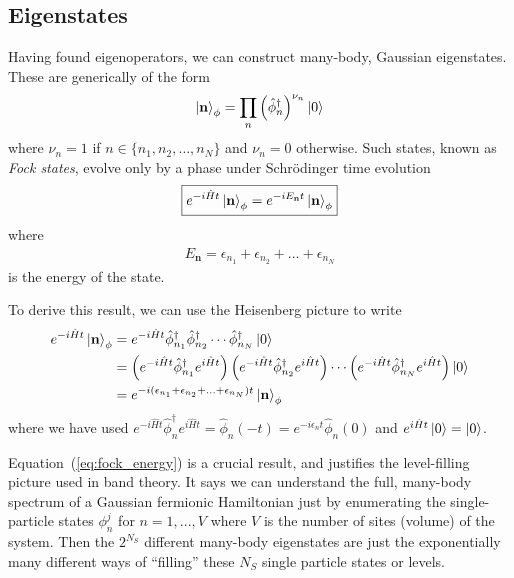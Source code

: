 \documentclass[aps, superscriptaddress, floatfix, onecolumn]{revtex4-2}
\begin{document}
\subsection{Eigenstates}

Having found eigenoperators, we can construct many-body, Gaussian eigenstates. These are generically of the form
\begin{align}
\ket{\mathbf{n}}_\phi = \prod_{n} \left(\hat{\phi}^\dagger_n \right)^{\nu_n} \ket{0}  
\end{align}
where $\nu_n = 1$ if $n \in \{n_1, n_2, \ldots, n_N \}$ and $\nu_n = 0$ otherwise. Such states, known as \emph{Fock states}, 
evolve only by a phase under Schr\"odinger time evolution
\begin{align}
\boxed{e^{-i \hat{H} t} \ket{\mathbf{n}}_\phi  = e^{-i E_\mathbf{n} t}  \ket{\mathbf{n}}_\phi }
\end{align}
where 
\begin{align}
\boxed{E_\mathbf{n}  = \epsilon_{n_1} + \epsilon_{n_2} + \ldots + \epsilon_{n_N}} \label{eq:fock_energy}
\end{align}
 is the energy of the state.
 
To derive this result, we can use the Heisenberg picture to write
\begin{align}
e^{-i \hat{H} t} \ket{\mathbf{n}}_\phi  & = e^{-i \hat{H} t} \hat{\phi}^\dagger_{n_1} \hat{\phi}^\dagger_{n_2} \cdots \hat{\phi}^\dagger_{n_N} \ket{0} \\
& =  \left( e^{-i \hat{H} t} \hat{\phi}^\dagger_{n_1}  e^{i \hat{H} t} \right) \left(e^{-i \hat{H} t} \hat{\phi}^\dagger_{n_2}  e^{i \hat{H} t} \right) \cdots  \left( e^{-i \hat{H} t} \hat{\phi}^\dagger_{n_N}  e^{i \hat{H} t}\right) \ket{0}  \\ 
& = e^{-i (\epsilon_{n_1} + \epsilon_{n_2} + \ldots + \epsilon_{n_N}) t} \ket{\mathbf{n}}_\phi \label{eq:eigenstate_t_evolution}
\end{align}
where we have used $e^{-i \hat{H} t} \hat{\phi}^\dagger_{n}  e^{i \hat{H} t} = \hat{\phi}_n(-t) =  e^{-i \epsilon_n t} \hat{\phi}_n(0)$ and $e^{i \hat{H} t} \ket{0} = \ket{0}$.
 
Equation~(\ref{eq:fock_energy}) is a crucial result, and justifies the level-filling picture used in band theory. It says we can understand the full, many-body spectrum of a Gaussian fermionic Hamiltonian just by enumerating the single-particle states $\phi_n^j$ for $n=1,...,V$ where $V$ is the number of sites (volume) of the system. Then the $2^{N_S}$ different many-body eigenstates are just the exponentially many different ways of ``filling'' these $N_S$ single particle states or levels.
\end{document}
